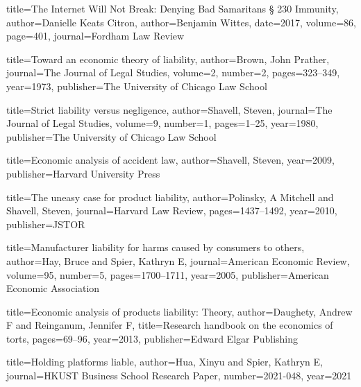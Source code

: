 
{
title={The Internet Will Not Break: Denying Bad Samaritans § 230 Immunity},
author={Danielle Keats Citron},
author={Benjamin Wittes},
date={2017},
volume=86,
page=401,
journal=Fordham Law Review
}




{
  title={Toward an economic theory of liability},
  author={Brown, John Prather},
  journal={The Journal of Legal Studies},
  volume={2},
  number={2},
  pages={323--349},
  year={1973},
  publisher={The University of Chicago Law School}
}

{
  title={Strict liability versus negligence},
  author={Shavell, Steven},
  journal={The Journal of Legal Studies},
  volume={9},
  number={1},
  pages={1--25},
  year={1980},
  publisher={The University of Chicago Law School}
}

{
  title={Economic analysis of accident law},
  author={Shavell, Steven},
  year={2009},
  publisher={Harvard University Press}
}


{
  title={The uneasy case for product liability},
  author={Polinsky, A Mitchell and Shavell, Steven},
  journal={Harvard Law Review},
  pages={1437--1492},
  year={2010},
  publisher={JSTOR}
}

{
  title={Manufacturer liability for harms caused by consumers to others},
  author={Hay, Bruce and Spier, Kathryn E},
  journal={American Economic Review},
  volume={95},
  number={5},
  pages={1700--1711},
  year={2005},
  publisher={American Economic Association}
}

{
  title={Economic analysis of products liability: Theory},
  author={Daughety, Andrew F and Reinganum, Jennifer F},
  title={Research handbook on the economics of torts},
  pages={69--96},
  year={2013},
  publisher={Edward Elgar Publishing}
}


{
  title={Holding platforms liable},
  author={Hua, Xinyu and Spier, Kathryn E},
  journal={HKUST Business School Research Paper},
  number={2021-048},
  year={2021}
}

